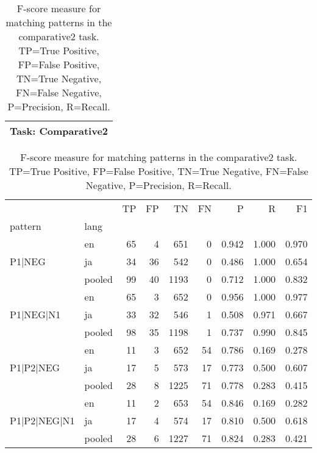 
\begin{table}[h!]
\centering
\begin{tabular}{p{}}
\toprule
\textbf{Task: Comparative2} \\
\midrule
\end{tabular}
\vspace{10pt}
\begin{tabular}{llrrrrrrr}
\toprule
 &  & TP & FP & TN & FN & P & R & F1 \\
pattern & lang &  &  &  &  &  &  &  \\
\midrule
\multirow[t]{3}{*}{P1|NEG} & en & 65 & 4 & 651 & 0 & 0.942 & 1.000 & 0.970 \\
 & ja & 34 & 36 & 542 & 0 & 0.486 & 1.000 & 0.654 \\
 & pooled & 99 & 40 & 1193 & 0 & 0.712 & 1.000 & 0.832 \\
\cline{1-9}
\multirow[t]{3}{*}{P1|NEG|N1} & en & 65 & 3 & 652 & 0 & 0.956 & 1.000 & 0.977 \\
 & ja & 33 & 32 & 546 & 1 & 0.508 & 0.971 & 0.667 \\
 & pooled & 98 & 35 & 1198 & 1 & 0.737 & 0.990 & 0.845 \\
\cline{1-9}
\multirow[t]{3}{*}{P1|P2|NEG} & en & 11 & 3 & 652 & 54 & 0.786 & 0.169 & 0.278 \\
 & ja & 17 & 5 & 573 & 17 & 0.773 & 0.500 & 0.607 \\
 & pooled & 28 & 8 & 1225 & 71 & 0.778 & 0.283 & 0.415 \\
\cline{1-9}
\multirow[t]{3}{*}{P1|P2|NEG|N1} & en & 11 & 2 & 653 & 54 & 0.846 & 0.169 & 0.282 \\
 & ja & 17 & 4 & 574 & 17 & 0.810 & 0.500 & 0.618 \\
 & pooled & 28 & 6 & 1227 & 71 & 0.824 & 0.283 & 0.421 \\
\cline{1-9}
\bottomrule
\end{tabular}
\caption{F-score measure for matching patterns in the comparative2 task. TP=True Positive, FP=False Positive, TN=True Negative, FN=False Negative, P=Precision, R=Recall.}
\label{tab:comparative2_f1}
\end{table}
